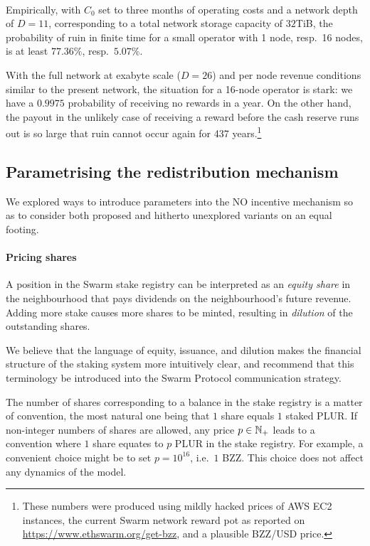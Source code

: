 \

Empirically, with $C_0$ set to three months of operating costs and a network depth of $D=11$, corresponding to a total network storage capacity of $32$TiB, the probability of ruin in finite time for a small operator with 1 node, resp.~16 nodes, is at least $77.36\%$, resp.~$5.07\%$.
    
With the full network at exabyte scale ($D=26$) and per node revenue conditions similar to the present network, the situation for a 16-node operator is stark: we have a $0.9975$ probability of receiving no rewards in a year.
%
On the other hand, the payout in the unlikely case of receiving a reward before the cash reserve runs out is so large that ruin cannot occur again for 437 years.\footnote{These numbers were produced using mildly hacked prices of AWS EC2 instances, the current Swarm network reward pot as reported on \url{https://www.ethswarm.org/get-bzz}, and a plausible BZZ/USD price.}

\subsection*{Parametrising the redistribution mechanism}

We explored ways to introduce parameters into the NO incentive mechanism so as to consider both proposed and hitherto unexplored variants on an equal footing.

\paragraph{Pricing shares}

A position in the Swarm stake registry can be interpreted as an \emph{equity share} in the neighbourhood that pays dividends on the neighbourhood's future revenue.
%
Adding more stake causes more shares to be minted, resulting in \emph{dilution} of the outstanding shares.

We believe that the language of equity, issuance, and dilution makes the financial structure of the staking system more intuitively clear, and recommend that this terminology be introduced into the Swarm Protocol communication strategy.

The number of shares corresponding to a balance in the stake registry is a matter of convention, the most natural one being that $1$ share equals $1$ staked PLUR.
%
If non-integer numbers of shares are allowed, any price $p\in\mathbb{N}_+$ leads to a convention where $1$ share equates to $p$ PLUR in the stake registry.
%
For example, a convenient choice might be to set $p=10^{16}$, i.e.~$1$ BZZ.
%
This choice does not affect any dynamics of the model.

